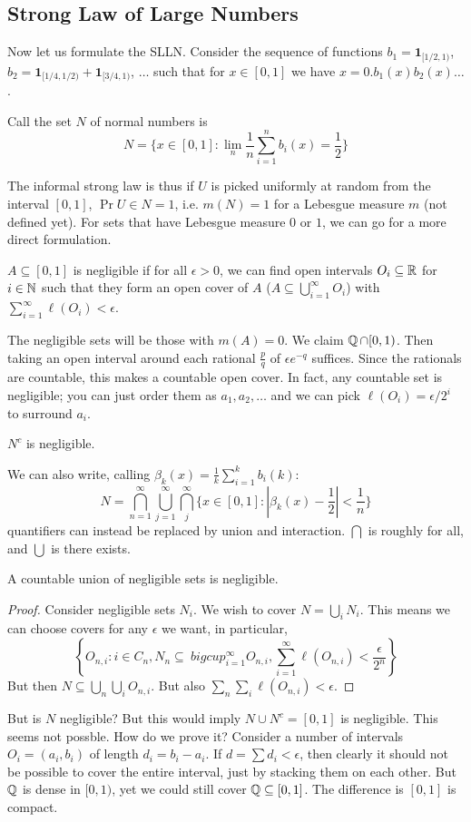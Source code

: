 \subsection{Strong Law of Large Numbers}
Now let us formulate the SLLN. Consider the sequence of functions $b_1 = \mathbf{1}_{[1/2, 1)}$, $b_2 = \mathbf{1}_{[1/4, 1/2)} + \mathbf{1}_{[3/4, 1)}$, $\dots$
such that for $x \in [0, 1]$ we have $x = 0.b_1(x) b_2(x) \dots$.
\begin{definition}
Call the set $N$ of normal numbers is
\[ N = \{x \in [0, 1] : \lim_n \frac{1}{n} \sum_{i = 1}^n b_i(x) = \frac12\} \]
\end{definition}
The informal strong law is thus if $U$ is picked uniformly at random from the interval $[0, 1]$,
$\Pr{U \in N} = 1$, i.e. $m(N) = 1$ for a Lebesgue measure $m$ (not defined yet). For sets that have Lebesgue measure
$0$ or $1$, we can go for a more direct formulation.
\begin{definition}
    $A \subseteq [0, 1]$ is negligible if for all $\epsilon > 0$, we can find open intervals $O_i \subseteq \operatorname{\mathbb{R}}$ for $i \in \operatorname{\mathbb{N}}$ such that they
    form an open cover of $A$ ($A \subseteq \bigcup_{i = 1}^{\infty} O_i$) with $\sum_{i = 1}^{\infty} \ell(O_i) < \epsilon$.
\end{definition}
The negligible sets will be those with $m(A) = 0$. We claim $\operatorname{\mathbb{Q}} \cap [0, 1)$. Then taking an open interval around each rational $\frac{p}{q}$
of 
$\epsilon e^{-q}$ suffices. Since the rationals are countable, this makes a countable open cover. In fact, any countable set
is negligible; you can just order them as $a_1, a_2, \dots$ and we can pick $\ell(O_i) = \epsilon/2^i$ to surround $a_i$.
\begin{theorem}
    $N^c$ is negligible.
\end{theorem}
We can also write, calling $\beta_k(x) = \frac{1}{k} \sum_{i = 1}^k b_i(k)$:
\[ N = \bigcap_{n = 1}^{\infty} \bigcup_{j = 1}^{\infty} \bigcap_{j}^{\infty} \{ x \in [0, 1] : |\beta_k(x) - \frac{1}{2}| < \frac{1}{n} \}\]
quantifiers can instead be replaced by union and interaction. $\bigcap$ is roughly for all, and $\bigcup$ is there exists.
\begin{theorem}
    A countable union of negligible sets is negligible.
    \begin{proof}
        Consider negligible sets $N_i$. We wish to cover $N = \bigcup_i N_i$.
        This means we can choose covers for any $\epsilon$ we want, in particular,
        \[ \left\{ O_{n, i} : i \in C_n, N_n \subseteq \ bigcup_{i = 1}^{\infty} O_{n, i}, \sum_{i = 1}^{\infty} \ell(O_{n, i}) < \frac{\epsilon}{2^n} \right\} \]
        But then $N \subseteq \bigcup_n \bigcup_i O_{n, i}$. But also $\sum_{n} \sum_{i} \ell(O_{n, i}) < \epsilon$.
    \end{proof}
\end{theorem}
But is $N$ negligible? But this would imply $N \cup N^c = [0, 1]$ is negligible. This seems
not possble. How do we prove it? Consider a number of intervals $O_i = (a_i, b_i)$ of length $d_i = b_i - a_i$.
If $d = \sum d_i < \epsilon$, then clearly it should not be possible to cover the entire interval, just by stacking them on each other. But $\operatorname{\mathbb{Q}}$ is dense in $[0, 1)$,
yet we could still cover $\operatorname{\mathbb{Q}} \subseteq [0, 1]$. The difference is $[0, 1]$ is compact.
